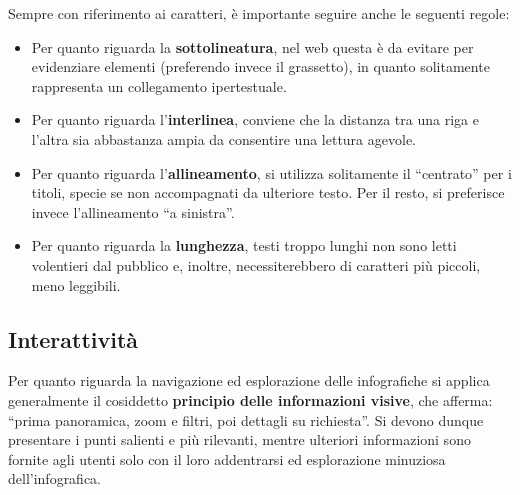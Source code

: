 Sempre con riferimento ai caratteri, è importante seguire anche le seguenti regole:
\begin{itemize}
    \item Per quanto riguarda la \textbf{sottolineatura}, nel web questa è da evitare per evidenziare elementi (preferendo invece il grassetto), in quanto solitamente rappresenta un collegamento 
    ipertestuale.
    \item Per quanto riguarda l'\textbf{interlinea}, conviene che la distanza tra una riga e l'altra sia abbastanza ampia da consentire una lettura agevole.
    \item Per quanto riguarda l'\textbf{allineamento}, si utilizza solitamente il ``centrato'' per i titoli, specie se non accompagnati da ulteriore testo. Per il resto, si preferisce invece l'allineamento
    ``a sinistra''.
    \item Per quanto riguarda la \textbf{lunghezza}, testi troppo lunghi non sono letti volentieri dal pubblico e, inoltre, necessiterebbero di caratteri più piccoli, meno leggibili.
\end{itemize}


\subsection{Interattività}
Per quanto riguarda la navigazione ed esplorazione delle infografiche si applica generalmente il cosiddetto \textbf{principio delle informazioni visive}, che afferma:
``prima panoramica, zoom e filtri, poi dettagli su richiesta''. Si devono dunque presentare i punti salienti e più rilevanti, mentre ulteriori informazioni sono fornite agli utenti solo con il loro addentrarsi ed esplorazione
minuziosa dell'infografica. 

